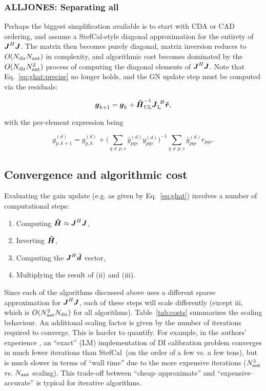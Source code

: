 \documentclass[useAMS,usenatbib]{mn2e}
\newcommand{\mat}[1]{{\bmath{#1}}}
\newcommand{\JJ}{\mat{J}} %
\newcommand{\HHa}{\mat{\tilde{H}}} %
\newcommand{\JHJ}{\JJ^H\JJ} %
\newcommand{\AUG}[1]{\bmath{\breve{#1}}}
\newcommand{\Rr}{\AUG{r}}
\newcommand{\Dd}{\AUG{d}}
\newcommand{\LEFT}{\mathrm{L}}
\newcommand{\UL}{\mathrm{UL}}%
\newcommand{\StefCal}{{\sc StefCal}}
\begin{document}
\subsubsection{ALLJONES: Separating all}

Perhaps the biggest simplification available is to start with CDA or CAD ordering, and assume a \StefCal-style diagonal 
approximation for the entirety of $\JHJ$. The matrix then becomes purely diagonal, matrix inversion reduces to $O(N_\mathrm{dir}N_\mathrm{ant})$ in 
complexity, and algorithmic cost becomes dominated by the $O(N_\mathrm{dir}N_\mathrm{ant}^2)$ process of computing the diagonal elements of 
$\JHJ$. Note that Eq.~\ref{eq:ghat:precise} no longer holds, and the GN update step must be computed via the residuals:

\[
\bmath{g}_{k+1} = \bmath{g}_k + \HHa^{-1}_\UL \JJ^{~H}_\LEFT \Rr,
\]

with the per-element expression being 

\begin{equation}
\label{eq:stefcal:dd:unpol}
g_{p,k+1}^{(d)} = g_{p,k}^{(d)} + 
\big( \sum\limits_{q\ne p,s} \bar{y}^{(d)}_{pqs} y^{(d)}_{pqs} \big)^{-1}
\sum\limits_{q\ne p,s} \bar{y}^{(d)}_{pqs} r_{pqs}.
\end{equation}

\subsection{Convergence and algorithmic cost}

Evaluating the gain update (e.g. as given by Eq.~\ref{eq:ghat}) involves a number of computational steps:

\begin{enumerate}
\item Computing $\HHa \approx \JHJ$,
\item Inverting $\HHa$,
\item Computing the $\JJ^H\Dd$ vector,
\item Multiplying the result of (ii) and (iii). 
\end{enumerate}

Since each of the algorithms discussed above uses a different sparse approximation for $\JHJ$, each of these 
steps will scale differently (except iii, which is $O(N_\mathrm{ant}^2N_\mathrm{dir})$ for all algorithms). Table~\ref{tab:costs} 
summarizes the scaling behaviour. 
An additional scaling factor is given by the number of iterations required to converge. This is harder
to quantify. For example, in the authors' experience \citep{OMS-Stefcal}, an ``exact'' (LM) implementation of
DI calibration problem converges in much fewer iterations than \StefCal\ (on the order of a few vs. a few tens), but is much 
slower in terms of ``wall time'' due to the more expensive iterations ($N_\mathrm{ant}^3$ vs. $N_\mathrm{ant}$ scaling). This trade-off  
between ``cheap--approximate'' and ``expensive--accurate'' is typical for iterative algorithms. 
\end{document}

